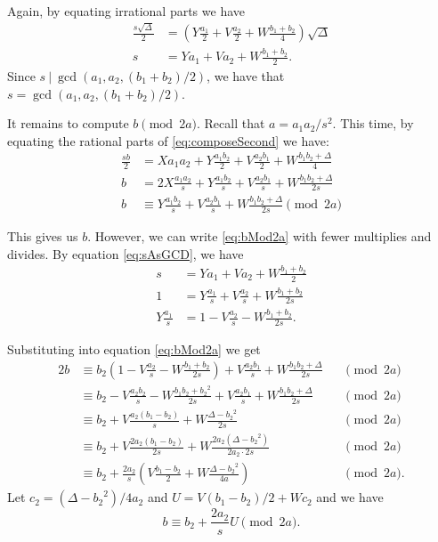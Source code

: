 \documentclass{ucalgthes1}
\theoremstyle{plain}
\theoremstyle{definition}
\begin{document}
\noindent
Again, by equating irrational parts we have
\begin{align}
	\frac{s\sqrt\Delta}{2} & = \left(Y\frac{a_1}{2} + V\frac{a_2}{2} + W\frac{b_1+b_2}{4}\right)\sqrt\Delta \nonumber \\
	s & = Ya_1 + Va_2 + W\frac{b_1+b_2}{2}. \label{eq:sAsGCD}
\end{align}
Since $s~|~\gcd(a_1, a_2, (b_1+b_2)/2)$, we have that $s = \gcd(a_1, a_2, (b_1+b_2)/2)$.  

It remains to compute $b \pmod{2a}$.  Recall that $a = a_1a_2/s^2$.  This time, by equating the rational parts of \eqref{eq:composeSecond} we have:
\begin{align}
	\frac{sb}{2} & = Xa_1a_2 + Y\frac{a_1b_2}{2} + V\frac{a_2b_1}{2} + W\frac{b_1b_2 + \Delta}{4} \nonumber \\
	b & = 2X\frac{a_1a_2}{s} + Y\frac{a_1b_2}{s} + V\frac{a_2b_1}{s} + W\frac{b_1b_2 + \Delta}{2s} \nonumber \\
	b & \equiv Y\frac{a_1b_2}{s} + V\frac{a_2b_1}{s} + W\frac{b_1b_2 + \Delta}{2s} \pmod{2a} \label{eq:bMod2a}
\end{align}

\noindent
This gives us $b$.  However, we can write \eqref{eq:bMod2a} with fewer multiplies and divides.  By equation \eqref{eq:sAsGCD}, we have
\begin{align*}
	s & = Ya_1 + Va_2 + W\frac{b_1+b_2}{2} \\
	1 & = Y\frac{a_1}{s} + V\frac{a_2}{s} + W\frac{b_1+b_2}{2s} \\
	Y\frac{a_1}{s} & = 1 - V\frac{a_2}{s} - W\frac{b_1+b_2}{2s}.
\end{align*}

\noindent
Substituting into equation \eqref{eq:bMod2a} we get
\begin{alignat*}{2}
	b & \equiv b_2(1-V\frac{a_2}{s} - W\frac{b_1+b_2}{2s}) + V\frac{a_2b_1}{s} + W\frac{b_1b_2 + \Delta}{2s} && \pmod{2a} \\
	& \equiv b_2 - V\frac{a_2b_2}{s} - W\frac{b_1b_2+{b_2}^2}{2s} + V\frac{a_2b_1}{s} + W\frac{b_1b_2 + \Delta}{2s} && \pmod{2a} \\
	& \equiv b_2 + V\frac{a_2(b_1-b_2)}{s} + W\frac{\Delta - {b_2}^2}{2s} && \pmod{2a} \\
	& \equiv b_2 + V\frac{2a_2(b_1-b_2)}{2s} + W\frac{2a_2(\Delta - {b_2}^2)}{2a_2 \cdot 2s} && \pmod{2a} \\
	& \equiv b_2 + \frac{2a_2}{s} \left( V\frac{b_1-b_2}{2} + W\frac{\Delta - {b_2}^2}{4a} \right) && \pmod{2a}.
\end{alignat*}
Let $c_2 = (\Delta - {b_2}^2)/4a_2$ and $U = V(b_1-b_2)/2 + Wc_2$ and we have
\[
	b \equiv b_2 + \frac{2a_2}{s} U \pmod{2a}.
\]
\end{document}
